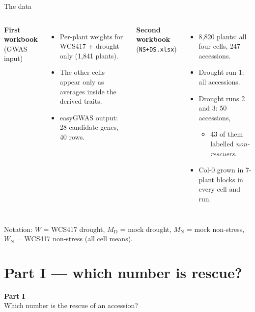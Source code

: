 \documentclass[aspectratio=169,11pt]{beamer}
\newcommand{\MD}{M_{\mathrm D}}
\newcommand{\MN}{M_{\mathrm N}}
\newcommand{\WN}{W_{\mathrm N}}
\begin{document}
\begin{frame}{The data}
  \begin{columns}[T]
    \textbf{First workbook} (GWAS input)
    \begin{itemize}
      \item Per-plant weights for WCS417 + drought only (1,841 plants).
      \item The other cells appear only as averages inside the derived traits.
      \item easyGWAS output: 28 candidate genes, 40 rows.
    \end{itemize}
    \textbf{Second workbook} (\texttt{NS+DS.xlsx})
    \begin{itemize}
      \item 8,820 plants: all four cells, 247 accessions.
      \item Drought run 1: all accessions.
      \item Drought runs 2 and 3: 50 accessions,
        \begin{itemize}
          \item 43 of them labelled \emph{non-rescuers}.
        \end{itemize}
      \item Col-0 grown in 7-plant blocks in every cell and run.
    \end{itemize}
  \end{columns}
  \vspace{1em}
  \small Notation: $W$ = WCS417 drought, $\MD$ = mock drought, $\MN$ = mock non-stress,
  $\WN$ = WCS417 non-stress (all cell means).
\end{frame}

\section{Part I --- which number is rescue?}
\begin{frame}
  \centering\Large\color{accent}\textbf{Part I}\\[0.4em]
  \normalsize\color{black} Which number is the rescue of an accession?
\end{frame}
\end{document}
